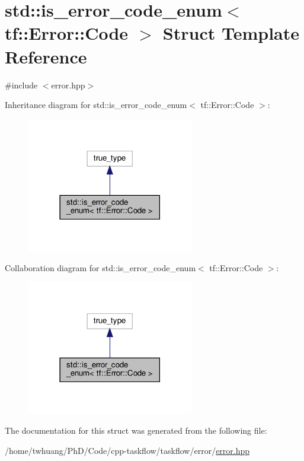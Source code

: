 \hypertarget{structstd_1_1is__error__code__enum_3_01tf_1_1Error_1_1Code_01_4}{}\section{std\+:\+:is\+\_\+error\+\_\+code\+\_\+enum$<$ tf\+:\+:Error\+:\+:Code $>$ Struct Template Reference}
\label{structstd_1_1is__error__code__enum_3_01tf_1_1Error_1_1Code_01_4}


{\ttfamily \#include $<$error.\+hpp$>$}



Inheritance diagram for std\+:\+:is\+\_\+error\+\_\+code\+\_\+enum$<$ tf\+:\+:Error\+:\+:Code $>$\+:\nopagebreak
\begin{figure}[H]
\begin{center}
\leavevmode
\includegraphics[width=206pt]{structstd_1_1is__error__code__enum_3_01tf_1_1Error_1_1Code_01_4__inherit__graph}
\end{center}
\end{figure}


Collaboration diagram for std\+:\+:is\+\_\+error\+\_\+code\+\_\+enum$<$ tf\+:\+:Error\+:\+:Code $>$\+:\nopagebreak
\begin{figure}[H]
\begin{center}
\leavevmode
\includegraphics[width=206pt]{structstd_1_1is__error__code__enum_3_01tf_1_1Error_1_1Code_01_4__coll__graph}
\end{center}
\end{figure}


The documentation for this struct was generated from the following file\+:\begin{DoxyCompactItemize}
\item 
/home/twhuang/\+Ph\+D/\+Code/cpp-\/taskflow/taskflow/error/\hyperlink{error_8hpp}{error.\+hpp}\end{DoxyCompactItemize}
